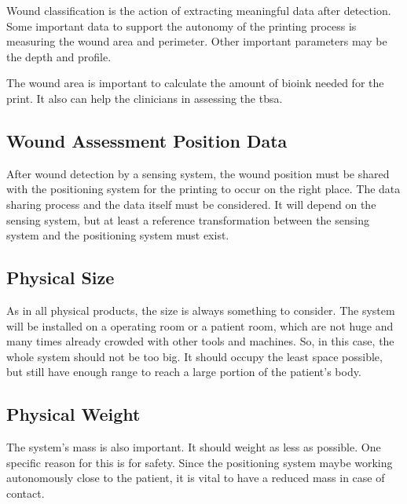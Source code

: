 Wound classification is the action of extracting meaningful data after detection. Some important data to support the autonomy of the printing process is measuring the wound area and perimeter. Other important parameters may be the depth and profile.

The wound area is important to calculate the amount of bioink needed for the print. It also can help the clinicians in assessing the \gls{tbsa}. 


\subsection{Wound Assessment Position Data}
\label{subsec:system_architecture_requirements_wound_assessment_position_sharing}

After wound detection by a sensing system, the wound position must be shared with the positioning system for the printing to occur on the right place. The data sharing process and the data itself must be considered. It will depend on the sensing system, but at least a reference transformation between the sensing system and the positioning system must exist.


\subsection{Physical Size}
\label{subsec:system_architecture_requirements_physical_size}

As in all physical products, the size is always something to consider. The system will be installed on a operating room or a patient room, which are not huge and many times already crowded with other tools and machines. So, in this case, the whole system should not be too big. It should occupy the least space possible, but still have enough range to reach a large portion of the patient's body.


\subsection{Physical Weight}
\label{subsec:system_architecture_requirements_physical_mass}

The system's mass is also important. It should weight as less as possible. One specific reason for this is for safety. Since the positioning system maybe working autonomously close to the patient, it is vital to have a reduced mass in case of contact. 

